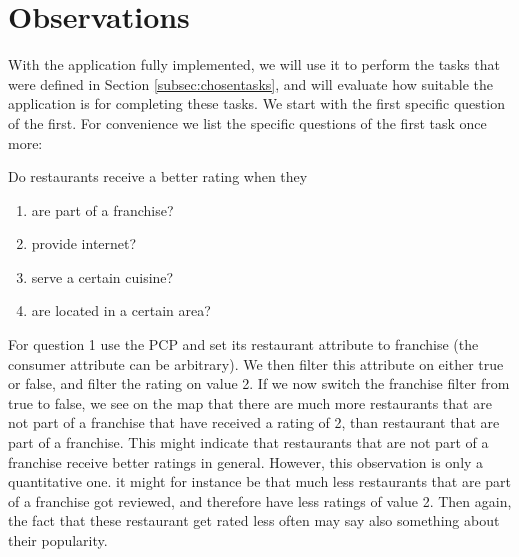 \section{Observations}\label{sec:observations}



With the application fully implemented, we will use it to perform the tasks that were defined in Section \ref{subsec:chosentasks}, and will evaluate how suitable the application is for completing these tasks. We start with the first specific question of the first. For convenience we list the specific questions of the first task once more:

Do restaurants receive a better rating when they
\begin{enumerate}
\setlength{\itemsep}{0cm}%
\setlength{\parskip}{0cm}%
\item are part of a franchise?
\item provide internet?
\item serve a certain cuisine?
\item are located in a certain area?
\end{enumerate}

For question 1 use the PCP and set its restaurant attribute to franchise (the consumer attribute can be arbitrary). We then filter this attribute on either true or false, and filter the rating on value 2. If we now switch the franchise filter from true to false, we see on the map that there are much more restaurants that are not part of a franchise that have received a rating of 2, than restaurant that are part of a franchise. This might indicate that restaurants that are not part of a franchise receive better ratings in general. However, this observation is only a quantitative one. it might for instance be that much less restaurants that are part of a franchise got reviewed, and therefore have less ratings of value 2. Then again, the fact that these restaurant get rated less often may say also something about their popularity.

